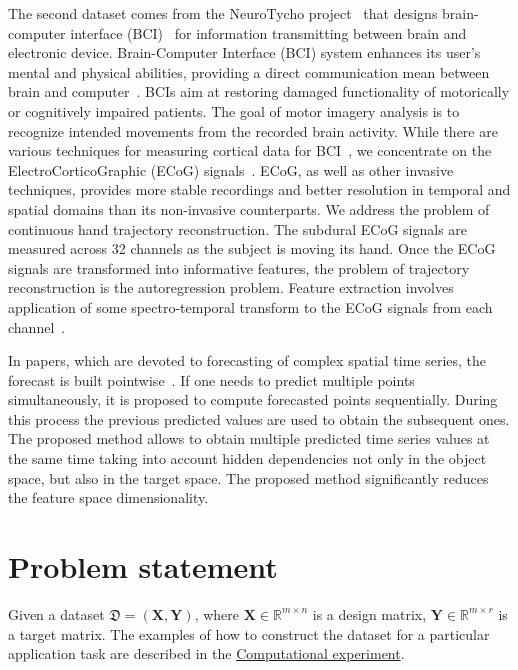 \documentclass[preprint,12pt]{elsarticle}
\newcommand{\bY}{\mathbf{Y}}
\newcommand{\bX}{\mathbf{X}}
\begin{document}
The second dataset comes from the NeuroTycho project~\cite{neurotycho} that designs brain-computer interface (BCI)~\cite{millan2010combining,mason2007comprehensive} for information transmitting between brain and electronic device.
Brain-Computer Interface (BCI) system enhances its user’s mental and physical abilities, providing a direct communication mean between brain and computer~\cite{millan2004brain}. 
BCIs aim at restoring damaged functionality of motorically or cognitively impaired patients.
The goal of motor imagery analysis is to recognize intended movements from the recorded brain activity. 
While there are various techniques for measuring cortical data for BCI~\cite{nicolas2012brain,amiri2013review}, we concentrate on the ElectroCorticoGraphic (ECoG) signals~\cite{eliseyev2016penalized}. 
ECoG, as well as other invasive techniques, provides more stable recordings and better resolution in temporal and spatial domains than its non-invasive counterparts.
We address the problem of continuous hand trajectory reconstruction. 
The subdural ECoG signals are measured across 32 channels as the subject is moving its hand.
Once the ECoG signals are transformed into informative features, the problem of trajectory reconstruction is the autoregression problem. 
Feature extraction involves application of some spectro-temporal transform to the ECoG signals from each channel~\cite{gasanov2017pls}.

In papers, which are devoted to forecasting of complex spatial time series, the forecast is built pointwise~\cite{box2015time,zhang2003time}.
If one needs to predict multiple points simultaneously, it is proposed to compute forecasted points sequentially.
During this process the previous predicted values are used to obtain the subsequent ones.
The proposed method allows to obtain multiple predicted time series values at the same time taking into account hidden dependencies not only in the object space, but also in the target space.
The proposed method significantly reduces the feature space dimensionality.

\section{Problem statement}

Given a dataset $\mathfrak{D}= \left( \bX, \bY \right)$, where $\mathbf{X} \in \mathbb{R}^{m \times n}$ is a design matrix, $\mathbf{Y} \in \mathbb{R}^{m \times r}$ is a target matrix. 
The examples of how to construct the dataset for a particular application task are described in the \hyperref[sec:exper]{Computational experiment}.
\end{document}
